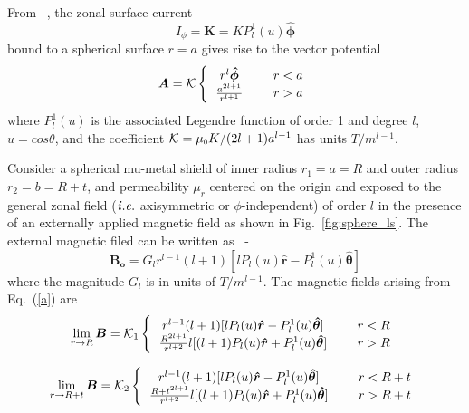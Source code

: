 From ~\cite{CB1, smythe}, the zonal surface current
\begin{equation}\label{i}
I_\phi=\bm{K}=KP_l^1(u)\bm{\hat{\phi}}
\end{equation}
bound to a spherical surface $r=a$ gives rise to the vector potential
\begin{equation}\label{a}
\bm A =\mathcal{K} 
\left \{
  \begin{tabular}{ccc}
  $r^l \bm{\hat{\phi}}$ &  & $r< a$  \\
  $\frac{a^{2l+1}}{r^{l+1}}$ &  & $r> a$ 
  \end{tabular}
 \right.
\end{equation}
where $P_l^1(u)$ is the associated Legendre function of order 1 and degree $l$,  $u=cos\theta$, and the coefficient $\mathcal{K}={\mu_{\scriptscriptstyle 0} K}/{(2l+1)a^{l-1}}$ has units $T/m^{l-1}$.


Consider a spherical mu-metal shield of inner radius $r_1=a=R$ and outer radius $r_2=b=R+t$, and permeability $\mu_r$ centered on the origin and exposed to the general zonal field ($\it{i.e.}$ axisymmetric or $\phi$-independent) of order $l$ in the presence of an externally applied magnetic field as shown in Fig.~\ref{fig:sphere_ls}. The external magnetic filed can be written as~\cite{CB1, smythe} -
\begin{equation}\label{bo}
\bm{B_o} = G_l r^{l-1} (l+1)[l P_l(u) \bm{\hat{r}} -  P_l^1(u)  \bm{\hat{\theta}} ] 
\end{equation}
where the magnitude $G_l$ is in units of $T/m^{l-1}$.
The magnetic fields arising from Eq.~(\ref{a}) are
\begin{equation}\label{r=R}
\lim_{r\to R}\bm B =\mathcal{K}_1
\left \{
  \begin{tabular}{ccc}
  $r^{l-1}(l+1)[l P_l(u)\bm{\hat{r}} -  P_l^1(u) \bm{\hat{\theta}} ]$ &  & $r< R$  \\
  $\frac{R^{2l+1}}{r^{l+2}}
l[(l+1) P_l(u) \bm{\hat{r}} +  P_l^1(u)  \bm{\hat{\theta}} ]$ &  & $r> R$  
  \end{tabular}
\right. 
\end{equation}

\begin{equation}\label{r=R+t}
\lim_{r\to R+t}\bm B =\mathcal{K}_2
\left \{
  \begin{tabular}{ccc}
  $r^{l-1} (l+1)[l P_l(u)\bm{\hat{r}} -  P_l^1(u)\bm{\hat{\theta}} ]$ &  & $r< R+t$  \\
  $\frac{{R+t}^{2l+1}}{r^{l+2}}l[(l+1) P_l(u)\bm{\hat{r}} +  P_l^1(u) \bm{\hat{\theta}} ]$ &  & $r> R+t$  
  \end{tabular}
\right.
\end{equation}

